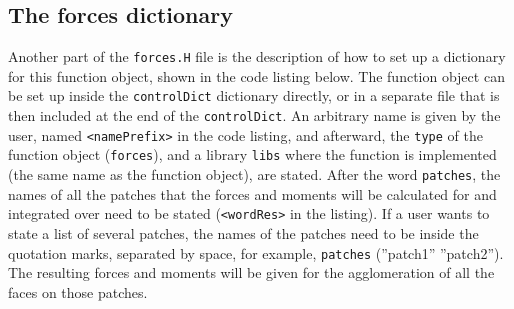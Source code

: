 \subsection{The forces dictionary}
Another part of the \texttt{forces.H} file is the description of how to set up a dictionary for this function object, shown in the code listing below. The function object can be set up inside the \texttt{controlDict} dictionary directly, or in a separate file that is then included at the end of the \texttt{controlDict}. An arbitrary name is given by the user, named \texttt{<namePrefix>} in the code listing, and afterward, the \texttt{type} of the function object (\texttt{forces}), and a library \texttt{libs} where the function is implemented (the same name as the function object), are stated. After the word \texttt{patches}, the names of all the patches that the forces and moments will be calculated for and integrated over need to be stated (\texttt{<wordRes>} in the listing). If a user wants to state a list of several patches, the names of the patches need to be inside the quotation marks, separated by space, for example, \texttt{patches} (”patch1” ”patch2”). The resulting forces and moments will be given for the agglomeration of all the faces on those patches.


